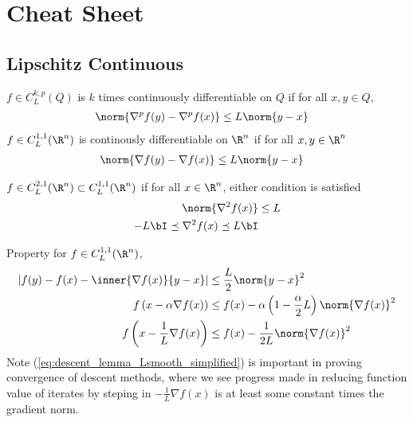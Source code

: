 \documentclass[../summary.tex]{subfiles}
\begin{document}
\section{Cheat Sheet} 

\subsection{Lipschitz Continuous}

\begin{definition}
    $f\in C_{L}^{k,p}(Q)$ is $k$ times continuously differentiable on $Q$ if for all $x,y\in Q$,
    \begin{align}
        \norm{\nabla^p f(y) - \nabla^p f(x)} 
            &\leq L\norm{y-x}
            \label{eq:definition_lipschitz_continuity}
    \end{align} 
    $f\in C_{L}^{1,1}(\R^n)$ is continously differentiable on $\R^n$ if for all $x,y\in\R^n$
    \begin{align}
        \norm{\nabla f(y) - \nabla f(x)} 
            &\leq L\norm{y-x}
            \label{eq:definition_Lsmooth_bounded_gradient}
    \end{align}
\end{definition}

\begin{definition}
    $f\in C_L^{2,1}(\R^n) \subset C_{L}^{1,1}(\R^n)$ if for all $x\in\R^n$, either condition is satisfied
    \begin{align}
        \norm{\nabla^2 f(x)}
            &\leq L 
            \label{eq:definition_Lsmooth_bounded_hessian} \\
        -L\bI \preceq \nabla^2 f(x) \preceq L\bI 
            \label{eq:definition_Lsmooth_bounded_hessian_matrixineq}
    \end{align}
\end{definition}

\noindent Property for $f\in C_L^{1,1}(\R^n)$, 
\begin{align}
    \left| 
        f(y) - f(x) - \inner{\nabla f(x)}{y-x}  \right|
        &\leq \frac{L}{2} \norm{y-x}^2
        \label{eq:descent_lemma_Lsmooth} \\
    f\left( x - \alpha \nabla f(x) \right)
        &\leq f(x) - \alpha\left( 1 - \frac{\alpha}{2}L\right) \norm{\nabla f(x)}^2 \\ 
    f\left( x - \frac{1}{L} \nabla f(x) \right)
        &\leq f(x) - \frac{1}{2L}\norm{\nabla f(x)}^2
        \label{eq:descent_lemma_Lsmooth_simplified}
\end{align}
Note (\ref{eq:descent_lemma_Lsmooth_simplified}) is important in proving convergence of descent methods, where we see progress made in reducing function value of iterates by steping in $-\frac{1}{L}\nabla f(x)$ is at least some constant times the gradient norm.
\end{document}
